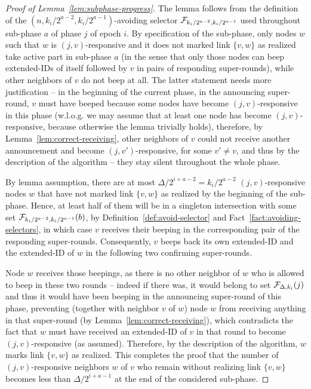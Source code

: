 \begin{proof}[Proof of Lemma~\ref{lem:subphase-progress}]
The lemma follows from the definition of the $(n,k_i/2^{a-2},k_i/2^{a-1})$-avoiding selector $\mathcal{F}_{k_i/2^{a-2},k_i/2^{a-1}}$ used throughout sub-phase $a$ of phase $j$ of epoch $i$. 
By specification of the sub-phase, only nodes $w$ such that $w$ is $(j,v)$-responsive and it does not marked link $\{v,w\}$ as realized take active part in sub-phase $a$ (in the sense that only those nodes can beep extended-IDs of itself followed by $v$ in pairs of responding super-rounds), while other neighbors of $v$ do not beep at all. The latter statement needs more justification -- in the beginning of the current phase, in the announcing super-round, $v$ must have beeped because some nodes have become $(j,v)$-responsive in this phase (w.l.o.g. we may assume that at least one node has become $(j,v)$-responsive, because otherwise the lemma trivially holds), therefore, by Lemma~\ref{lem:correct-receiving}, other neighbors of $v$ could not receive another announcement and become $(j,v')$-responsive, for some $v'\ne v$, and thus by the description of the algorithm -- they stay silent throughout the whole phase. 

By lemma assumption, there are at most $\Delta/2^{i+a-2}=k_i/2^{a-2}$ $(j,v)$-responsive nodes $w$ that have not marked link $\{v,w\}$ as realized by the beginning of the sub-phase. Hence, at least half of them will be in a singleton intersection with some set $\mathcal{F}_{k_i/2^{a-2},k_i/2^{a-1}}(b)$, by Definition~\ref{def:avoid-selector} and Fact~\ref{fact:avoiding-selectors}, in which case $v$ receives their beeping in the corresponding pair of the responding super-rounds. Consequently, $v$ beeps back its own extended-ID and the extended-ID of $w$ in the following two confirming super-rounds. 

Node $w$ receives those beepings, as there is no other neighbor of $w$ who is allowed to beep in these two rounds -- indeed if there was, it would belong to set $\mathcal{F}_{\Delta,k_i}(j)$ and thus it would have been beeping in the announcing super-round of this phase, preventing (together with neighbor $v$ of $w$) node $w$ from receiving anything in that super-round (by Lemma~\ref{lem:correct-receiving}), which contradicts the fact that $w$ must have received an extended-ID of $v$ in that round to become $(j,v)$-responsive (as assumed). Therefore, by the description of the algorithm, $w$ marks link $\{v,w\}$ as realized. This completes the proof that the number of $(j,v)$-responsive neighbors $w$ of $v$ who remain without realizing link $\{v,w\}$ becomes less than $\Delta/2^{i+a-1}$ at the end of the considered sub-phase. 
\end{proof}


